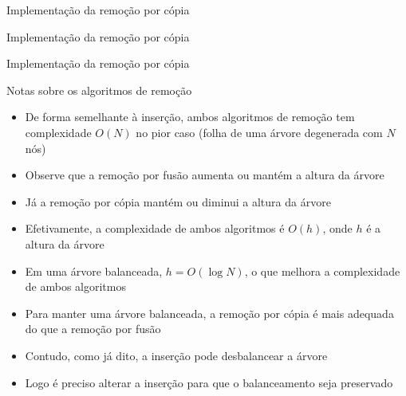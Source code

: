 \begin{frame}[fragile]{Implementação da remoção por cópia}
\end{frame}

\begin{frame}[fragile]{Implementação da remoção por cópia}
\end{frame}

\begin{frame}[fragile]{Implementação da remoção por cópia}
\end{frame}

\begin{frame}[fragile]{Notas sobre os algoritmos de remoção}

    \begin{itemize}
        \item De forma semelhante à inserção, ambos algoritmos de remoção tem complexidade 
            $O(N)$ no pior caso (folha de uma árvore degenerada com $N$ nós)

        \item Observe que a remoção por fusão aumenta ou mantém a altura da árvore

        \item Já a remoção por cópia mantém ou diminui a altura da árvore

        \item Efetivamente, a complexidade de ambos algoritmos é $O(h)$, onde $h$ é a altura da
            árvore

        \item Em uma árvore balanceada, $h = O(\log N)$, o que melhora a complexidade de 
            ambos algoritmos

        \item Para manter uma árvore balanceada, a remoção por cópia é mais adequada do que
            a remoção por fusão

        \item Contudo, como já dito, a inserção pode desbalancear a árvore

        \item Logo é preciso alterar a inserção para que o balanceamento seja preservado
    \end{itemize}

\end{frame}
